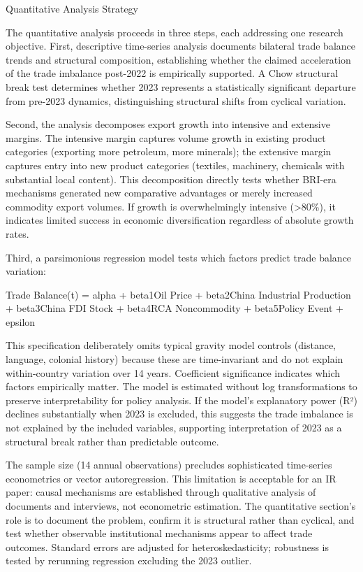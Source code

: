 \documentclass[12pt]{article}
\begin{document}
Quantitative Analysis Strategy\par
The quantitative analysis proceeds in three steps, each addressing one research objective. First, descriptive time-series analysis documents bilateral trade balance trends and structural composition, establishing whether the claimed acceleration of the trade imbalance post-2022 is empirically supported. A Chow structural break test determines whether 2023 represents a statistically significant departure from pre-2023 dynamics, distinguishing structural shifts from cyclical variation.\par
Second, the analysis decomposes export growth into intensive and extensive margins. The intensive margin captures volume growth in existing product categories (exporting more petroleum, more minerals); the extensive margin captures entry into new product categories (textiles, machinery, chemicals with substantial local content). This decomposition directly tests whether BRI-era mechanisms generated new comparative advantages or merely increased commodity export volumes. If growth is overwhelmingly intensive (>80\%), it indicates limited success in economic diversification regardless of absolute growth rates.\par
Third, a parsimonious regression model tests which factors predict trade balance variation:\par
Trade Balance(t) = alpha + beta1Oil Price + beta2China Industrial Production + beta3China FDI Stock + beta4RCA Noncommodity + beta5Policy Event + epsilon\par
This specification deliberately omits typical gravity model controls (distance, language, colonial history) because these are time-invariant and do not explain within-country variation over 14 years. Coefficient significance indicates which factors empirically matter. The model is estimated without log transformations to preserve interpretability for policy analysis. If the model's explanatory power (R²) declines substantially when 2023 is excluded, this suggests the trade imbalance is not explained by the included variables, supporting interpretation of 2023 as a structural break rather than predictable outcome.\par
The sample size (14 annual observations) precludes sophisticated time-series econometrics or vector autoregression. This limitation is acceptable for an IR paper: causal mechanisms are established through qualitative analysis of documents and interviews, not econometric estimation. The quantitative section's role is to document the problem, confirm it is structural rather than cyclical, and test whether observable institutional mechanisms appear to affect trade outcomes. Standard errors are adjusted for heteroskedasticity; robustness is tested by rerunning regression excluding the 2023 outlier.\par
\end{document}
